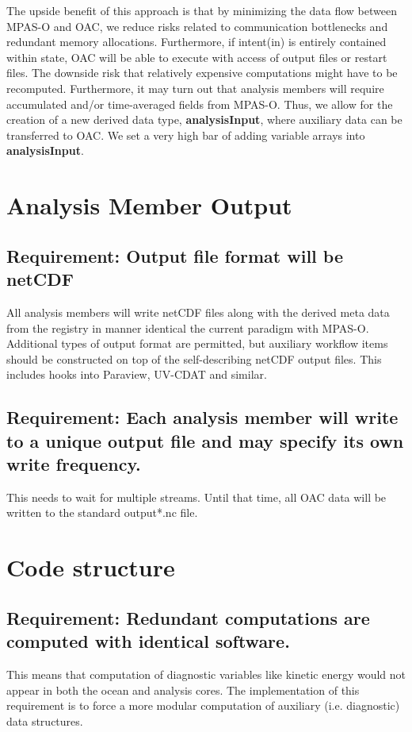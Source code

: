 \documentclass[11pt]{report}
\begin{document}
The upside benefit of this approach is that by minimizing the data flow between MPAS-O and OAC, we reduce risks related to communication bottlenecks and redundant memory allocations. Furthermore, if intent(in) is entirely contained within state, OAC will be able to execute with access of output files or restart files. The downside risk that relatively expensive computations might have to be recomputed. Furthermore, it may turn out that analysis members will require accumulated and/or time-averaged fields from MPAS-O. Thus, we allow for the creation of a new derived data type, {\bf analysisInput}, where auxiliary data can be transferred to OAC. We set a very high bar of adding variable arrays into {\bf analysisInput}.

\newpage
\section{Analysis Member Output}
\subsection{Requirement: Output file format will be netCDF}
All analysis members will write netCDF files along with the derived meta data from the registry in manner identical the current paradigm with MPAS-O. Additional types of output format are permitted, but auxiliary workflow items should be constructed on top of the self-describing netCDF output files. This includes hooks into Paraview, UV-CDAT and similar.

\subsection{{\color{red} Requirement}: Each analysis member will write to a unique output file and may specify its own write frequency.}
This needs to wait for  multiple streams.  Until that time, all OAC data will be written to the standard output*.nc file.


\newpage
\section{Code structure}
\subsection{Requirement: Redundant computations are computed with identical software.\label{requirement: redundant code}}
This means that computation of diagnostic variables like kinetic energy would not appear in both the ocean and analysis cores. The implementation of this requirement is to force a more modular computation of auxiliary (i.e. diagnostic) data structures.
\end{document}
